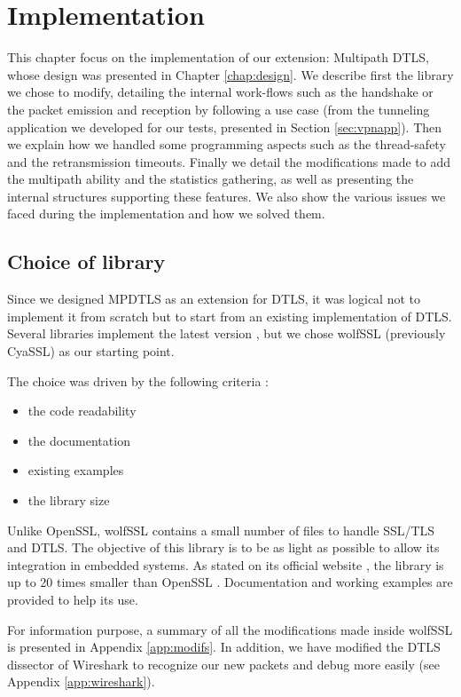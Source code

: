 \chapter{Implementation}\label{chap:implementation}

This chapter focus on the implementation of our extension: Multipath DTLS\cite{wolfssl-mpdtls}, whose design was presented in Chapter \ref{chap:design}. We describe first the library we chose to modify, detailing the internal work-flows such as the handshake or the packet emission and reception by following a use case (from the tunneling application we developed for our tests, presented in Section \ref{sec:vpnapp}). Then we explain how we handled some programming aspects such as the thread-safety and the retransmission timeouts. Finally we detail the modifications made to add the multipath ability and the statistics gathering, as well as presenting the internal structures supporting these features. We also show the various issues we faced during the implementation and how we solved them.

\section{Choice of library}

Since we designed MPDTLS as an extension for DTLS, it was logical not to implement it from scratch but to start from an existing implementation of DTLS. Several libraries implement the latest version \cite{wiki:dtls-implem}, but we chose wolfSSL \cite{wolfssl.git} (previously CyaSSL) as our starting point.

The choice was driven by the following criteria :
\begin{itemize}
\item the code readability
\item the documentation
\item existing examples
\item the library size
\end{itemize}

Unlike OpenSSL, wolfSSL contains a small number of files to handle SSL/TLS and DTLS. The objective of this library is to be as light as possible to allow its integration in embedded systems. As stated on its official website \cite{wolfssl}, the library is up to 20 times smaller than OpenSSL \cite{openssl}. Documentation and working examples are provided to help its use.

For information purpose, a summary of all the modifications made inside wolfSSL is presented in Appendix \ref{app:modifs}. In addition, we have modified the DTLS dissector of Wireshark\cite{wireshark} to recognize our new packets and debug more easily (see Appendix \ref{app:wireshark}).

